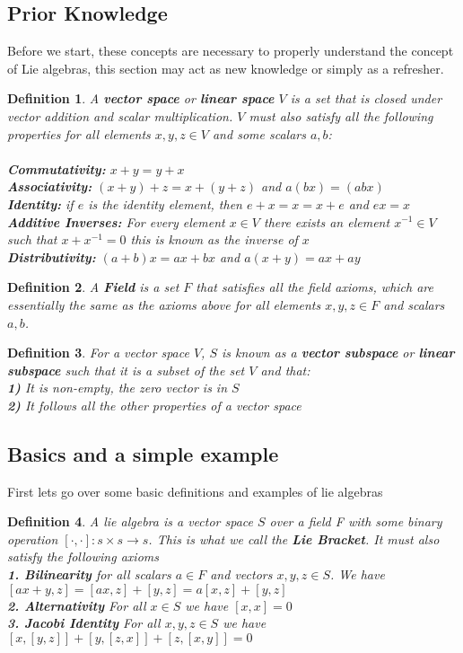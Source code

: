 \documentclass[12pt, letterpaper]{article}
\newtheorem*{defn}{Definition}
\begin{document}
\subsection{Prior Knowledge}
Before we start, these concepts are necessary to properly understand the concept of Lie algebras, this section may act as new knowledge or simply as a refresher.
\begin{defn}
A \textbf{vector space} or \textbf{linear space} $V$ is a set that is closed under vector addition and scalar multiplication. $V$ must also satisfy all the following properties for all elements $x,y,z \in V$ and some scalars $a,b$:\\\\
\textbf{Commutativity: } $x + y = y + x$\\
\textbf{Associativity:} $(x + y) + z = x + (y + z)$ and $a(bx) = (abx)$\\
\textbf{Identity:} if $e$ is the identity element, then $e + x = x = x + e$ and $ex = x$\\
\textbf{Additive Inverses:} For every element $x \in V$ there exists an element $x^{-1} \in V$ such that $x + x^{-1} = 0$ this is known as the inverse of $x$\\
\textbf{Distributivity:} $(a+b)x = ax + bx$ and $a(x + y) = ax + ay$
\end{defn}

\begin{defn}
A \textbf{Field} is a set $F$ that satisfies all the field axioms, which are essentially the same as the axioms above for all elements $x,y,z \in F$ and scalars $a,b$.
\end{defn}

\begin{defn}
For a vector space $V$, $S$ is known as a \textbf{vector subspace} or \textbf{linear subspace} such that it is a subset of the set $V$ and that:\\
\textbf{1) } It is non-empty, the zero vector is in $S$\\
\textbf{2) } It follows all the other properties of a vector space
\end{defn}
\subsection{Basics and a simple example}
First lets go over some basic definitions and examples of lie algebras
\begin{defn}
A lie algebra is a vector space $S$ over a field F with some binary operation $[ \cdot, \cdot ]: s \times s \rightarrow s$. This is what we call the \textbf{Lie Bracket}. It must also satisfy the following axioms\\
\textbf{1. Bilinearity} for all scalars $a \in F$ and vectors $x,y,z \in S$. We have $[ax+y, z] = [ax, z] + [y,z] = a[x, z] + [y,z]$\\
\textbf{2. Alternativity} For all $x \in S$ we have $[x, x] = 0$\\
\textbf{3. Jacobi Identity} For all $x,y,z \in S$ we have $[x, [y, z]] + [y, [z, x]] + [z, [x, y]] = 0$
\end{defn}
\end{document}
